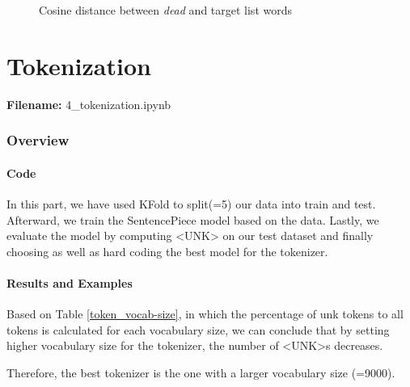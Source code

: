 \documentclass[12pt, a4paper]{article}
\begin{document}
\begin{itemize}
		\begin{figure}[H]
			\caption{Cosine distance between \emph{dead} and target list words}
			\label{w2v_cos_similar_dead}
		\end{figure}

	\end{itemize}

	\newpage
	\part{Tokenization}
	\large{\textbf{Filename:} 4\_tokenization.ipynb}
	\section{Overview}
	
	\subsection{Code}
	In this part, we have used KFold to split(=5) our data into train and test. Afterward, we train the SentencePiece model based on the data. Lastly, we evaluate the model by computing <UNK> on our test dataset and finally choosing as well as hard coding the best model for the tokenizer. 
	
	\subsection{Results and Examples}
	Based on Table \ref{token_vocab-size}, in which the percentage of unk tokens to all tokens is calculated for each vocabulary size, we can conclude that by setting higher vocabulary size for the tokenizer, the number of <UNK>s decreases.
	
	Therefore, the best tokenizer is the one with a larger vocabulary size (=9000).
	
\end{document}
